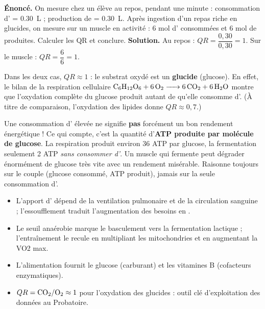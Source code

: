 \documentclass[11pt]{article}
\begin{document}
\begin{exoresolu}
\textbf{Énoncé.} On mesure chez un élève au repos, pendant une minute : consommation d' = \SI{0,30}{L} ; production de  = \SI{0,30}{L}. Après ingestion d'un repas riche en glucides, on mesure sur un muscle en activité : 6 mol d' consommées et 6 mol de  produites. Calculer les QR et conclure.
\tcblower
\textbf{Solution.} Au repos : $QR = \dfrac{0{,}30}{0{,}30} = 1$. Sur le muscle : $QR = \dfrac{6}{6} = 1$.

Dans les deux cas, $QR \approx 1$ : le substrat oxydé est un \textbf{glucide} (glucose). En effet, le bilan de la respiration cellulaire $\ce{C6H12O6 + 6O2 -> 6CO2 + 6H2O}$ montre que l'oxydation complète du glucose produit autant de  qu'elle consomme d'. (À titre de comparaison, l'oxydation des lipides donne $QR \approx 0{,}7$.)
\end{exoresolu}

\begin{attention}
Une consommation d' élevée ne signifie \textbf{pas} forcément un bon rendement énergétique ! Ce qui compte, c'est la quantité d'\textbf{ATP produite par molécule de glucose}. La respiration produit environ 36 ATP par glucose, la fermentation seulement 2 ATP \emph{sans consommer d'}. Un muscle qui fermente peut dégrader énormément de glucose très vite avec un rendement misérable. Raisonne toujours sur le couple (glucose consommé, ATP produit), jamais sur la seule consommation d'.
\end{attention}

\begin{aretenir}
\begin{itemize}
\item L'apport d' dépend de la ventilation pulmonaire et de la circulation sanguine ; l'essoufflement traduit l'augmentation des besoins en .
\item Le seuil anaérobie marque le basculement vers la fermentation lactique ; l'entraînement le recule en multipliant les mitochondries et en augmentant la VO2 max.
\item L'alimentation fournit le glucose (carburant) et les vitamines B (cofacteurs enzymatiques).
\item $QR = \ce{CO2}/\ce{O2} \approx 1$ pour l'oxydation des glucides : outil clé d'exploitation des données au Probatoire.
\end{itemize}
\end{aretenir}
\end{document}
